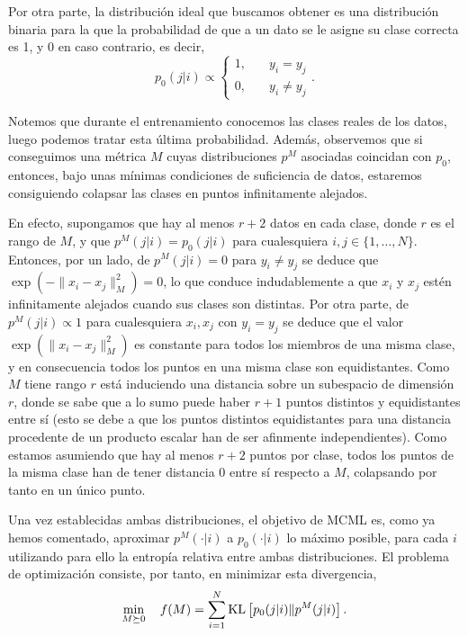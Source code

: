 Por otra parte, la distribución ideal que buscamos obtener es una distribución binaria para la que la probabilidad de que a un dato se le asigne su clase correcta es 1, y 0 en caso contrario, es decir,
\begin{equation}
    p_0(j|i) \propto \begin{cases}1, &\quad y_i = y_j \\ 0, &\quad y_i \ne y_j\end{cases}.
\end{equation}

Notemos que durante el entrenamiento conocemos las clases reales de los datos, luego podemos tratar esta última probabilidad. Además, observemos que si conseguimos una métrica $M$ cuyas distribuciones $p^M$ asociadas coincidan con $p_0$, entonces, bajo unas mínimas condiciones de suficiencia de datos, estaremos consiguiendo colapsar las clases en puntos infinitamente alejados. 

En efecto, supongamos que hay al menos $r + 2$ datos en cada clase, donde $r$ es el rango de $M$, y que $p^M(j|i) = p_0(j|i)$ para cualesquiera $i,j \in \{1,\dots,N\}$. Entonces, por un lado, de $p^M(j|i) = 0$ para $y_i \ne y_j$ se deduce que $\exp(-\|x_i-x_j\|^2_M) = 0$, lo que conduce indudablemente a que $x_i$ y $x_j$ estén infinitamente alejados cuando sus clases son distintas. Por otra parte, de $p^M(j|i) \propto 1$ para cualesquiera $x_i,x_j$ con $y_i = y_j$ se deduce que el valor $\exp(\|x_i-x_j\|_M^2)$ es constante para todos los miembros de una misma clase, y en consecuencia todos los puntos en una misma clase son equidistantes. Como $M$ tiene rango $r$ está induciendo una distancia sobre un subespacio de dimensión $r$, donde se sabe que a lo sumo puede haber $r+1$ puntos distintos y equidistantes entre sí (esto se debe a que los puntos distintos equidistantes para una distancia procedente de un producto escalar han de ser afinmente independientes). Como estamos asumiendo que hay al menos $r+2$ puntos por clase, todos los puntos de la misma clase han de tener distancia 0 entre sí respecto a $M$, colapsando por tanto en un único punto.

Una vez establecidas ambas distribuciones, el objetivo de MCML es, como ya hemos comentado, aproximar $p^M(\cdot|i)$ a $p_0(\cdot|i)$ lo máximo posible, para cada $i$ utilizando para ello la entropía relativa entre ambas distribuciones. El problema de optimización consiste, por tanto, en minimizar esta divergencia,
\begin{equation}
    \min_{M \succeq 0}\quad f(M) = \sum_{i=1}^N \operatorname{KL} \left[ p_0(j|i) \| p^M(j|i) \right].
\end{equation} 

